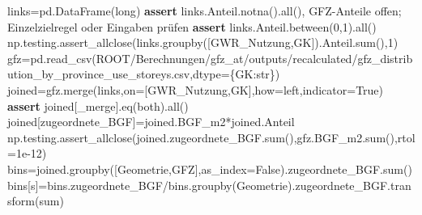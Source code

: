 \documentclass[
  ngerman,
  a4paper,
  DIV=11]{scrreprt}
\newenvironment{Shaded}{\begin{snugshade}}{\end{snugshade}}
\newcommand{\BuiltInTok}[1]{\textcolor[rgb]{0.00,0.23,0.31}{#1}}
\newcommand{\ControlFlowTok}[1]{\textcolor[rgb]{0.00,0.23,0.31}{\textbf{#1}}}
\newcommand{\DecValTok}[1]{\textcolor[rgb]{0.68,0.00,0.00}{#1}}
\newcommand{\FloatTok}[1]{\textcolor[rgb]{0.68,0.00,0.00}{#1}}
\newcommand{\NormalTok}[1]{\textcolor[rgb]{0.00,0.23,0.31}{#1}}
\newcommand{\OperatorTok}[1]{\textcolor[rgb]{0.37,0.37,0.37}{#1}}
\newcommand{\StringTok}[1]{\textcolor[rgb]{0.13,0.47,0.30}{#1}}
\newcommand{\VariableTok}[1]{\textcolor[rgb]{0.07,0.07,0.07}{#1}}
\begin{document}
\begin{Shaded}
\begin{Highlighting}[]
\NormalTok{links}\OperatorTok{=}\NormalTok{pd.DataFrame(}\BuiltInTok{long}\NormalTok{)}
\ControlFlowTok{assert}\NormalTok{ links.Anteil.notna().}\BuiltInTok{all}\NormalTok{(), }\StringTok{\textquotesingle{}GFZ{-}Anteile offen; Einzelzielregel oder Eingaben prüfen\textquotesingle{}}
\ControlFlowTok{assert}\NormalTok{ links.Anteil.between(}\DecValTok{0}\NormalTok{,}\DecValTok{1}\NormalTok{).}\BuiltInTok{all}\NormalTok{()}
\NormalTok{np.testing.assert\_allclose(links.groupby([}\StringTok{\textquotesingle{}GWR\_Nutzung\textquotesingle{}}\NormalTok{,}\StringTok{\textquotesingle{}GK\textquotesingle{}}\NormalTok{]).Anteil.}\BuiltInTok{sum}\NormalTok{(),}\DecValTok{1}\NormalTok{)}
\NormalTok{gfz}\OperatorTok{=}\NormalTok{pd.read\_csv(ROOT}\OperatorTok{/}\StringTok{\textquotesingle{}Berechnungen/gfz\_at/outputs/recalculated/gfz\_distribution\_by\_province\_use\_storeys.csv\textquotesingle{}}\NormalTok{,dtype}\OperatorTok{=}\NormalTok{\{}\StringTok{\textquotesingle{}GK\textquotesingle{}}\NormalTok{:}\BuiltInTok{str}\NormalTok{\})}
\NormalTok{joined}\OperatorTok{=}\NormalTok{gfz.merge(links,on}\OperatorTok{=}\NormalTok{[}\StringTok{\textquotesingle{}GWR\_Nutzung\textquotesingle{}}\NormalTok{,}\StringTok{\textquotesingle{}GK\textquotesingle{}}\NormalTok{],how}\OperatorTok{=}\StringTok{\textquotesingle{}left\textquotesingle{}}\NormalTok{,indicator}\OperatorTok{=}\VariableTok{True}\NormalTok{)}
\ControlFlowTok{assert}\NormalTok{ joined[}\StringTok{\textquotesingle{}\_merge\textquotesingle{}}\NormalTok{].eq(}\StringTok{\textquotesingle{}both\textquotesingle{}}\NormalTok{).}\BuiltInTok{all}\NormalTok{()}
\NormalTok{joined[}\StringTok{\textquotesingle{}zugeordnete\_BGF\textquotesingle{}}\NormalTok{]}\OperatorTok{=}\NormalTok{joined.BGF\_m2}\OperatorTok{*}\NormalTok{joined.Anteil}
\NormalTok{np.testing.assert\_allclose(joined.zugeordnete\_BGF.}\BuiltInTok{sum}\NormalTok{(),gfz.BGF\_m2.}\BuiltInTok{sum}\NormalTok{(),rtol}\OperatorTok{=}\FloatTok{1e{-}12}\NormalTok{)}
\NormalTok{bins}\OperatorTok{=}\NormalTok{joined.groupby([}\StringTok{\textquotesingle{}Geometrie\textquotesingle{}}\NormalTok{,}\StringTok{\textquotesingle{}GFZ\textquotesingle{}}\NormalTok{],as\_index}\OperatorTok{=}\VariableTok{False}\NormalTok{).zugeordnete\_BGF.}\BuiltInTok{sum}\NormalTok{()}
\NormalTok{bins[}\StringTok{\textquotesingle{}s\textquotesingle{}}\NormalTok{]}\OperatorTok{=}\NormalTok{bins.zugeordnete\_BGF}\OperatorTok{/}\NormalTok{bins.groupby(}\StringTok{\textquotesingle{}Geometrie\textquotesingle{}}\NormalTok{).zugeordnete\_BGF.transform(}\StringTok{\textquotesingle{}sum\textquotesingle{}}\NormalTok{)}

\end{Highlighting}
\end{Shaded}
\end{document}

